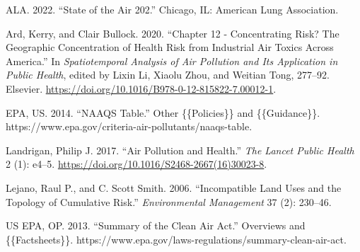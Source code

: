 \documentclass[
  letterpaper,
  DIV=11,
  numbers=noendperiod]{scrartcl}
\newlength{\cslhangindent}
\newlength{\cslentryspacingunit} %
\newenvironment{CSLReferences}[2] %
 {%
  \setlength{\parindent}{0pt}
  \ifodd #1
  \let\oldpar\par
  \def\par{\hangindent=\cslhangindent\oldpar}
  \fi
  \setlength{\parskip}{#2\cslentryspacingunit}
 }%
 {}
\begin{document}
\hypertarget{refs}{}
\begin{CSLReferences}{1}{0}
\leavevmode{}%
ALA. 2022. {``State of the {Air} 202.''} {Chicago, IL}: {American Lung
Association}.

\leavevmode{}%
Ard, Kerry, and Clair Bullock. 2020. {``Chapter 12 - {Concentrating}
Risk? {The} Geographic Concentration of Health Risk from Industrial Air
Toxics Across {America}.''} In \emph{Spatiotemporal {Analysis} of {Air
Pollution} and {Its Application} in {Public Health}}, edited by Lixin
Li, Xiaolu Zhou, and Weitian Tong, 277--92. {Elsevier}.
\url{https://doi.org/10.1016/B978-0-12-815822-7.00012-1}.

\leavevmode{}%
EPA, US. 2014. {``{NAAQS Table}.''} Other \{\{Policies\}\} and
\{\{Guidance\}\}.
https://www.epa.gov/criteria-air-pollutants/naaqs-table.

\leavevmode{}%
Landrigan, Philip J. 2017. {``Air Pollution and Health.''} \emph{The
Lancet Public Health} 2 (1): e4--5.
\url{https://doi.org/10.1016/S2468-2667(16)30023-8}.

\leavevmode{}%
Lejano, Raul P., and C. Scott Smith. 2006. {``Incompatible {Land Uses}
and the {Topology} of {Cumulative Risk}.''} \emph{Environmental
Management} 37 (2): 230--46.

\leavevmode{}%
US EPA, OP. 2013. {``Summary of the {Clean Air Act}.''} Overviews and
\{\{Factsheets\}\}.
https://www.epa.gov/laws-regulations/summary-clean-air-act.

\end{CSLReferences}
\end{document}
